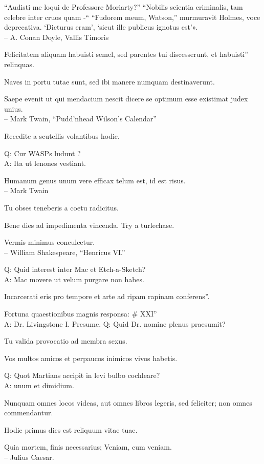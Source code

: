 \documentclass[titlepage,12pt]{memoir}
\begin{document}
 “Audisti me loqui de Professore Moriarty?”
“Nobilis scientia criminalis, tam celebre inter cruos quam -“
“Fudorem meum, Watson,” murmuravit Holmes, voce deprecativa.
‘Dicturus eram’, ‘sicut ille publicus ignotus est’».
\\-- A. Conan Doyle, Vallis Timoris

Felicitatem aliquam habuisti semel, sed parentes tui discesserunt, et habuisti”
relinquas.

Naves in portu tutae sunt, sed ibi manere numquam destinaverunt.

Saepe evenit ut qui mendacium nescit dicere se optimum esse existimat
judex unius.
\\-- Mark Twain, “Pudd’nhead Wilson’s Calendar”

Recedite a scutellis volantibus hodie.

Q: Cur WASPs ludunt ?\\
A: Ita ut lenones vestiant.

Humanum genus unum vere efficax telum est, id est risus.
\\-- Mark Twain

Tu obses teneberis a coetu radicitus.

Bene dies ad impedimenta vincenda. Try a turlechase.

Vermis minimus conculcetur.
\\-- William Shakespeare, “Henricus VI.”

Q: Quid interest inter Mac et Etch-a-Sketch?\\
A: Mac movere ut velum purgare non habes.

Incarcerati eris pro tempore et arte ad ripam rapinam conferens”.

Fortuna quaestionibus magnis responsa: \# XXI”\\
A: Dr. Livingstone I. Presume.
Q: Quid Dr. nomine plenus praesumit?

Tu valida provocatio ad membra sexus.

Vos multos amicos et perpaucos inimicos vivos habetis.

Q: Quot Martians accipit in levi bulbo cochleare?\\
A: unum et dimidium.

Nunquam omnes locos videas, aut omnes libros legeris, sed feliciter;
non omnes commendantur.

Hodie primus dies est reliquum vitae tuae.

Quia mortem, finis necessarius;
Veniam, cum veniam.
\\-- Julius Caesar.
\end{document}
